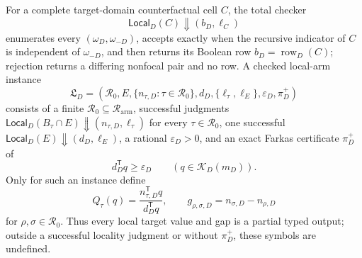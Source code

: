 For a complete target-domain counterfactual cell \(C\), the total checker
\[
\mathsf{Local}_D(C)\Downarrow(b_D,\ell_C)
\]
enumerates every \((\omega_D,\omega_{-D})\), accepts exactly when the recursive indicator of \(C\) is independent of \(\omega_{-D}\), and then returns its Boolean row \(b_D=\operatorname{row}_D(C)\); rejection returns a differing nonfocal pair and no row.  A checked local-arm instance
\[
\mathfrak L_D=(\mathcal R_0,E,\{n_{\tau,D}:\tau\in\mathcal R_0\},d_D,\{\ell_{\tau},\ell_E\},\varepsilon_D,\pi_D^+)
\]
consists of a finite \(\mathcal R_0\subseteq\mathcal R_{\mathrm{arm}}\), successful judgments \(\mathsf{Local}_D(B_\tau\cap E)\Downarrow(n_{\tau,D},\ell_\tau)\) for every \(\tau\in\mathcal R_0\), one successful \(\mathsf{Local}_D(E)\Downarrow(d_D,\ell_E)\), a rational \(\varepsilon_D>0\), and an exact Farkas certificate \(\pi_D^+\) of
\[
d_D^{\mathsf T}q\ge\varepsilon_D\qquad(q\in\mathcal K_D(m_D)).
\]
Only for such an instance define
\[
Q_\tau(q)=\frac{n_{\tau,D}^{\mathsf T}q}{d_D^{\mathsf T}q},\qquad
g_{\rho,\sigma,D}=n_{\sigma,D}-n_{\rho,D}
\]
for \(\rho,\sigma\in\mathcal R_0\).  Thus every local target value and gap is a partial typed output; outside a successful locality judgment or without \(\pi_D^+\), these symbols are undefined.